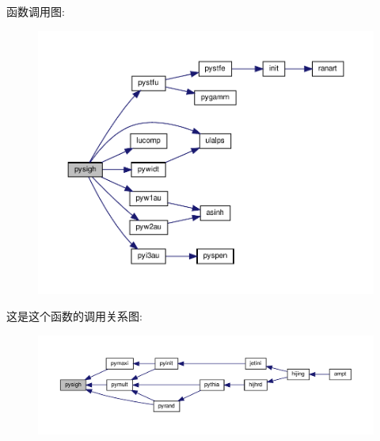 函数调用图\+:
\nopagebreak
\begin{figure}[H]
\begin{center}
\leavevmode
\includegraphics[width=350pt]{pysigh_8f90_a6090ead4366be41cbc8112be6b047172_cgraph}
\end{center}
\end{figure}
这是这个函数的调用关系图\+:
\nopagebreak
\begin{figure}[H]
\begin{center}
\leavevmode
\includegraphics[width=350pt]{pysigh_8f90_a6090ead4366be41cbc8112be6b047172_icgraph}
\end{center}
\end{figure}
